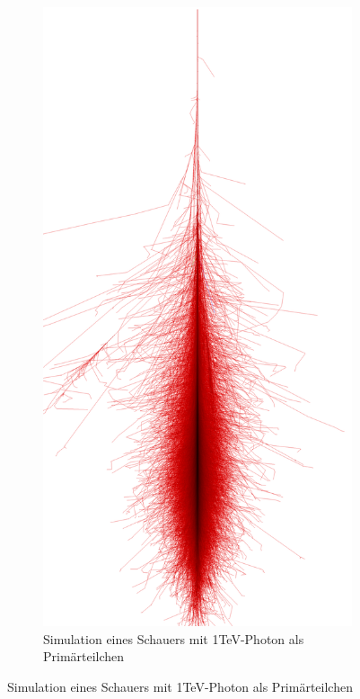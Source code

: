 \begin{figure}
 \begin{subfigure}{0.4\textwidth}
  \includegraphics[width=\textwidth]{./Plots/Photon_1TeV_CORSIKA.png}
  \caption{Simulation eines Schauers mit 1TeV-Photon als Primärteilchen}

\end{subfigure}
\end{figure}
